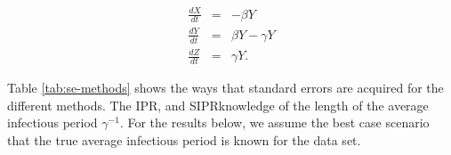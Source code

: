 \documentclass[12pt]{article}
\newcommand{\rr}{\ensuremath{\mathcal{R}_0}}
\begin{document}
\begin{eqnarray*}
	\frac{dX}{dt} &=& -\beta Y \\
	\frac{dY}{dt} &=& \beta Y - \gamma Y \\
	\frac{dZ}{dt} &=& \gamma Y.
\end{eqnarray*}


	
	
	
	
	
	
	
	
	



Table \ref{tab:se-methods} shows the ways that standard errors are acquired for the different methods. The IPR, and SIPRknowledge of the length of the average infectious period $\gamma^{-1}$. For the results below, we assume the best case scenario that the true average infectious period is known for the data set. 
\end{document}
